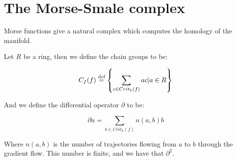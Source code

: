 \section{The Morse-Smale complex}

Morse functions give a natural complex which computes the homology
of the manifold.

Let $R$ be a ring, then we define the chain groups 
to be:

$$
C_f(f)
\stackrel{\text{def}}{=}
\left\{
\sum
_
{c\in Crit_k(f)}
a c
\vert
a\in R
\right\}
$$

And we define the differential operator $\partial$ to be:

$$
\partial a
=
\sum
_{b\in Crit_k(f)}
n(a,b)b
$$

Where $n(a,b)$ is the number of trajectories flowing from $a$
to $b$ through the gradient flow. This number is finite, and
we have that $\partial^2$.


